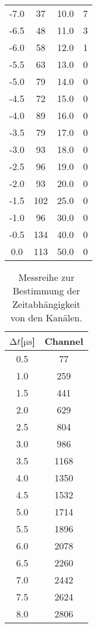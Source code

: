 \begin{table}
\begin{tabular}{c c || c c}
        -7.0     &   37     &    10.0      &   7    \\
        -6.5   &   48     &    11.0      &   3    \\
        -6.0     &   58     &    12.0      &   1    \\
        -5.5   &   63     &    13.0      &   0    \\
        -5.0     &   79     &    14.0      &   0    \\
        -4.5   &   72     &    15.0      &   0    \\
        -4.0     &   89     &    16.0      &   0    \\
        -3.5   &   79     &    17.0      &   0    \\
        -3.0     &   93     &    18.0      &   0    \\
        -2.5   &   96     &    19.0      &   0    \\
        -2.0     &   93     &    20.0      &   0    \\
        -1.5   &   102    &    25.0      &   0    \\
        -1.0     &   96     &    30.0      &   0    \\
        -0.5   &   134    &    40.0      &   0    \\
        0.0      &   113    &       50.0   &   0    \\
    \end{tabular}
\end{table}
 
\begin{table}
    \centering
    \caption{Messreihe zur Bestimmung der Zeitabhängigkeit von den Kanälen.} 
    \label{tab:1122332211}
    \begin{tabular}{c c}
        \toprule
        $\increment t$[$\si{\micro\second}$] & Channel \\
        \midrule
        0.5   &  77\\
        1.0     &  259\\ 
        1.5   &  441\\
        2.0     &  629\\
        2.5   &  804\\
        3.0     &  986\\
        3.5   &  1168\\
        4.0     &  1350\\
        4.5   &  1532\\
        5.0     &  1714\\
        5.5   &  1896\\
        6.0     &  2078\\
        6.5   &  2260\\
        7.0     &  2442\\
        7.5   &  2624\\
        8.0     &  2806\\
    \end{tabular}
\end{table}